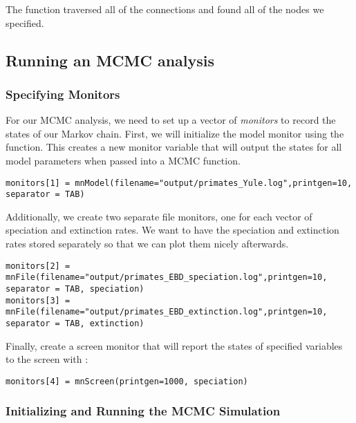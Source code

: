The  function traversed all of the connections and found all of the nodes we specified. 


\subsection{Running an MCMC analysis}

\subsubsection{Specifying Monitors}

For our MCMC analysis, we need to set up a vector of \textit{monitors} to record the states of our Markov chain. 
First, we will initialize the model monitor using the  function. This creates a new monitor variable that will output the states for all model parameters when passed into a MCMC function. 
{\tt \begin{snugshade*}
\begin{lstlisting}
monitors[1] = mnModel(filename="output/primates_Yule.log",printgen=10, separator = TAB)
\end{lstlisting}
\end{snugshade*}}

Additionally, we create two separate file monitors, one for each vector of speciation and extinction rates.
We want to have the speciation and extinction rates stored separately so that we can plot them nicely afterwards.
{\tt \begin{snugshade*}
\begin{lstlisting}
monitors[2] = mnFile(filename="output/primates_EBD_speciation.log",printgen=10, separator = TAB, speciation)
monitors[3] = mnFile(filename="output/primates_EBD_extinction.log",printgen=10, separator = TAB, extinction)
\end{lstlisting}
\end{snugshade*}}

Finally, create a screen monitor that will report the states of specified variables to the screen with :
{\tt \begin{snugshade*}
\begin{lstlisting}
monitors[4] = mnScreen(printgen=1000, speciation)
\end{lstlisting}
\end{snugshade*}}

\subsubsection{Initializing and Running the MCMC Simulation}

